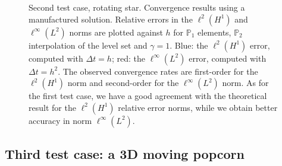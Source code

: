 \documentclass[11pt,a4paper]{article}
\theoremstyle{plain}
\theoremstyle{definition}
\theoremstyle{remark}
\numberwithin{equation}{section}
\newcommand{\logLogSlopeTriangle}[5]
{

    \pgfplotsextra
    {
        \pgfkeysgetvalue{/pgfplots/xmin}{\xmin}
        \pgfkeysgetvalue{/pgfplots/xmax}{\xmax}
        \pgfkeysgetvalue{/pgfplots/ymin}{\ymin}
        \pgfkeysgetvalue{/pgfplots/ymax}{\ymax}

        \pgfmathsetmacro{\xArel}{#1}
        \pgfmathsetmacro{\yArel}{#3}
        \pgfmathsetmacro{\xBrel}{#1-#2}
        \pgfmathsetmacro{\yBrel}{\yArel}
        \pgfmathsetmacro{\xCrel}{\xArel}

        \pgfmathsetmacro{\lnxB}{\xmin*(1-(#1-#2))+\xmax*(#1-#2)} %
        \pgfmathsetmacro{\lnxA}{\xmin*(1-#1)+\xmax*#1} %
        \pgfmathsetmacro{\lnyA}{\ymin*(1-#3)+\ymax*#3} %
        \pgfmathsetmacro{\lnyC}{\lnyA+#4*(\lnxA-\lnxB)}
        \pgfmathsetmacro{\yCrel}{(\lnyC-\ymin)/(\ymax-\ymin)} %

        \coordinate (A) at (rel axis cs:\xArel,\yArel);
        \coordinate (B) at (rel axis cs:\xBrel,\yBrel);
        \coordinate (C) at (rel axis cs:\xCrel,\yCrel);

        \draw[#5]   (A)-- node[pos=0.5,anchor=north] {1}
                    (B)--
                    (C)-- node[pos=0.5,anchor=west] {#4}
                    cycle;
    }
}
\begin{document}
\begin{figure}
    \centering
    

    \caption{Second test case, rotating star. Convergence results using a manufactured solution. Relative errors in the $\ell^2(H^1)$ and $\ell^\infty(L^2)$ norms are plotted against $h$ for $\mathbb{P}_1$ elements, $\mathbb{P}_2$ interpolation of the level set and $\gamma=1$. Blue: the $\ell^2(H^1)$ error, computed with $\Delta t = h$; red: the $\ell^\infty(L^2)$ error, computed with $\Delta t = h^2$. The observed convergence rates are first-order for the $\ell^2(H^1)$ norm and second-order for the $\ell^\infty(L^2)$ norm. As for the first test case, we have a good agreement with the theoretical result for the $\ell^2(H^1)$ relative error norms, while we obtain better accuracy in norm $\ell^\infty(L^2)$.}
    \label{fig:convergence2}
\end{figure}


\subsection{Third test case: a 3D moving {popcorn}}
\end{document}
